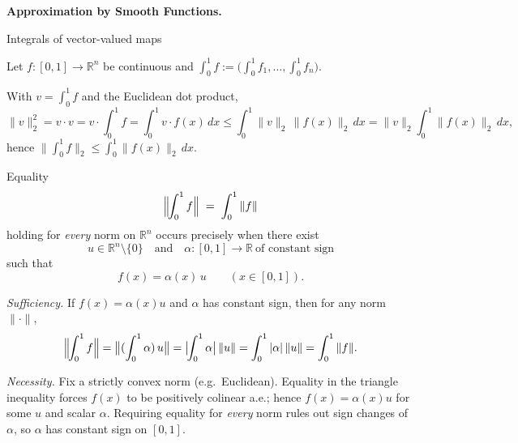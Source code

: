 \begin{problem}[CP-II-0478]
\label{prob:cp-ii-0478}
\textbf{Approximation by Smooth Functions.}

\hspace*{1.5em}Integrals of vector-valued maps

Let $f:[0,1]\to\mathbb R^n$ be continuous and $\displaystyle \int_0^1 f:=\big(\int_0^1 f_1,\dots,\int_0^1 f_n\big)$.

	With $v=\int_0^1 f$ and the Euclidean dot product,
	\[
	\|v\|_2^2=v\cdot v=v\cdot \int_0^1 f=\int_0^1 v\cdot f(x)\,dx
	\le \int_0^1 \|v\|_2\,\|f(x)\|_2\,dx
	=\|v\|_2\int_0^1 \|f(x)\|_2\,dx,
	\]
	hence $\Big\|\int_0^1 f\Big\|_2 \le \int_0^1 \|f(x)\|_2\,dx$.

Equality
\[
\Bigl\|\!\int_{0}^{1} f \Bigr\| \;=\; \int_{0}^{1} \|f\|
\]
holding for \emph{every} norm on $\mathbb{R}^n$ occurs precisely when there exist
\[
u\in\mathbb{R}^n\setminus\{0\}
\quad\text{and}\quad
\alpha:[0,1]\to\mathbb{R}\ \text{of constant sign}
\]
such that
\[
f(x)=\alpha(x)\,u \qquad (x\in[0,1]).
\]

\noindent\textit{Sufficiency.}
If $f(x)=\alpha(x)u$ and $\alpha$ has constant sign, then for any norm $\|\cdot\|$,
\[
\Bigl\|\!\int_{0}^{1} f \Bigr\|
=\bigl\| (\int_{0}^{1}\alpha)\,u \bigr\|
= \bigl|\!\int_{0}^{1}\alpha \bigr|\,\|u\|
= \int_{0}^{1} |\alpha|\,\|u\|
= \int_{0}^{1} \|f\|.
\]

\noindent\textit{Necessity.}
Fix a strictly convex norm (e.g.\ Euclidean). Equality in the triangle inequality forces
$f(x)$ to be positively colinear a.e.; hence $f(x)=\alpha(x)u$ for some $u$ and scalar $\alpha$.
Requiring equality for \emph{every} norm rules out sign changes of $\alpha$, so $\alpha$ has
constant sign on $[0,1]$.
\medskip
\end{problem}

